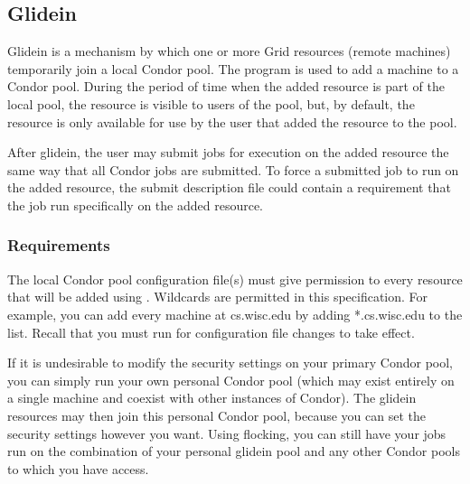 \subsection{\label{sec:Glidein}Glidein}

Glidein is a mechanism by which one or more Grid resources (remote machines)
temporarily join a local Condor pool. 
The program  is used to add a machine
to a Condor pool.
During the period of time when the added resource is
part of the local pool, the resource is visible 
to users of the pool, but, by default, the resource is only available for
use by the user
that added the resource to the pool.

After glidein, the user may submit jobs for execution on the
added resource the same way that all Condor jobs are submitted.
To force a submitted job to run on the added resource, the
submit description file could contain a requirement that the job run 
specifically on the added resource.


\subsubsection{ Requirements}

The local Condor pool configuration file(s) must 
give  permission
to every resource that will be added using . 
Wildcards are permitted in this specification.
For example, you can add every machine at
cs.wisc.edu by adding *.cs.wisc.edu to the
 list.
Recall that you must run  for configuration
file changes to take effect.

If it is undesirable to modify the security settings on
your primary Condor pool, you can simply run your own
personal Condor pool (which may exist entirely on a single
machine and coexist with other instances of Condor).  The glidein
resources may then join this personal Condor pool, because
you can set the security settings however you want.  Using
flocking, you can still have your jobs run on the combination
of your personal glidein pool and any other Condor pools to
which you have access.

